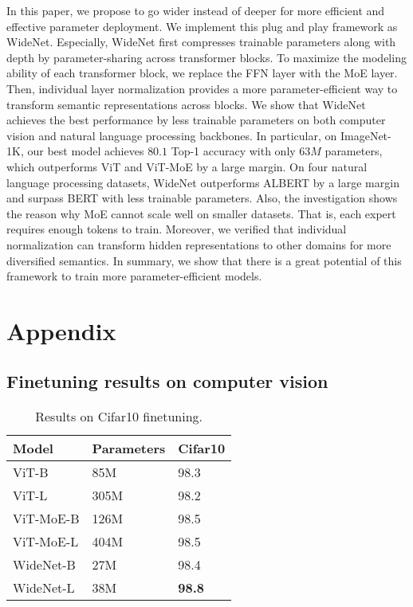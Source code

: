 \documentclass[letterpaper]{article} \usepackage{aaai22}  \usepackage{times}  \usepackage{helvet}  \usepackage{courier}  \usepackage[hyphens]{url}  \usepackage{graphicx} \urlstyle{rm} \def\UrlFont{\rm}  \usepackage{natbib}  \usepackage{caption} \DeclareCaptionStyle{ruled}{labelfont=normalfont,labelsep=colon,strut=off} \frenchspacing  \setlength{\pdfpagewidth}{8.5in}  \setlength{\pdfpageheight}{11in}  \usepackage{algorithm}
\begin{document}
In this paper, we propose to go wider instead of deeper for more efficient and effective parameter deployment. We implement this plug and play framework as WideNet. Especially, WideNet first compresses trainable parameters along with depth by parameter-sharing across transformer blocks. To maximize the modeling ability of each transformer block, we replace the FFN layer with the MoE layer. Then, individual layer normalization provides a more parameter-efficient way to transform semantic representations across blocks. We show that WideNet achieves the best performance by less trainable parameters on both computer vision and natural language processing backbones. In particular, on ImageNet-1K, our best model achieves $80.1$ Top-1 accuracy with only $63M$ parameters, which outperforms ViT and ViT-MoE by a large margin. On four natural language processing datasets, WideNet outperforms ALBERT by a large margin and surpass BERT with less trainable parameters. Also, the investigation shows the reason why MoE cannot scale well on smaller datasets. That is, each expert requires enough tokens to train. Moreover, we verified that individual normalization can transform hidden representations to other domains for more diversified semantics. In summary, we show that there is a great potential of this framework to train more parameter-efficient models. 




\clearpage

\appendix
\section{Appendix}
\label{appendix}


\subsection{Finetuning results on computer vision}\label{appendix:cv-finetune}


\begin{table}[ht]
\centering
\caption{Results on Cifar10 finetuning.}
\label{tbl-main-finetune-Cifar10}
\begin{tabular}{l|l l}
\toprule
Model     & Parameters   & Cifar10\\ \midrule
ViT-B               & 85M       &  98.3      \\
ViT-L              & 305M         &   98.2    \\ \midrule
ViT-MoE-B           & 126M          &  98.5   \\
ViT-MoE-L           & 404M        &   98.5  \\ \midrule
WideNet-B         & 27M        &     98.4    \\
WideNet-L          & 38M     &       \textbf{98.8}    \\
\bottomrule
\end{tabular}
\end{table}
\end{document}
